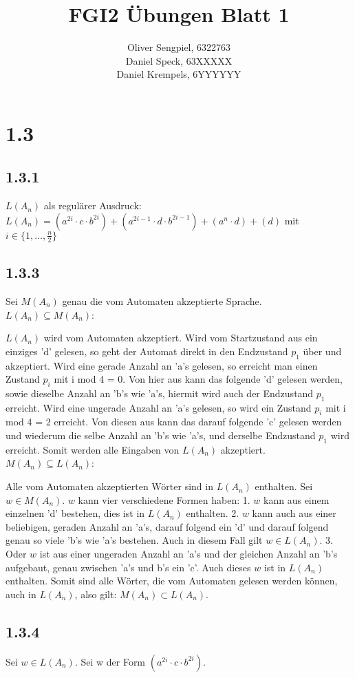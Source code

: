 \documentclass{article}
\title{FGI2 Übungen Blatt 1}
\author{Oliver Sengpiel, 6322763 \\
	Daniel Speck, 63XXXXX \\
	Daniel Krempels, 6YYYYYY}
\begin{document}
\maketitle

\section{1.3}
\subsection{1.3.1}
$L(A_n)$ als regulärer Ausdruck: \\
$L(A_n) = (a^{2i}\cdot c\cdot b^{2i}) + (a^{2i-1}\cdot d\cdot b^{2i-1}) +
(a^{n}\cdot d) + (d)$ mit $i \in \{1, \dots, \frac{n}{2} \}$

\subsection{1.3.3}
Sei $M(A_n)$ genau die vom Automaten akzeptierte Sprache. \\
$L(A_n) \subseteq M(A_n)$: 

$L(A_n)$ wird vom Automaten akzeptiert. Wird vom Startzustand aus ein einziges 'd' gelesen, so geht der Automat direkt in den Endzustand $p_1$ über und akzeptiert. Wird eine gerade Anzahl an 'a's gelesen, so erreicht man einen Zustand $p_i$ mit i mod 4 = 0. Von hier aus kann das folgende 'd' gelesen werden, sowie dieselbe Anzahl an 'b's wie 'a's, hiermit wird auch der Endzustand $p_1$ erreicht. Wird eine ungerade Anzahl an 'a's gelesen, so wird ein Zustand $p_i$ mit i mod 4 = 2 erreicht. Von diesen aus kann das darauf folgende 'c' gelesen werden und wiederum die selbe Anzahl an 'b's wie 'a's, und derselbe Endzustand $p_1$ wird erreicht. Somit werden alle Eingaben von $L(A_n)$ akzeptiert. \\
$M(A_n) \subseteq L(A_n)$: 

Alle vom Automaten akzeptierten Wörter sind in $L(A_n)$ enthalten. Sei $w \in M(A_n)$. $w$ kann vier verschiedene Formen haben: 1. $w$ kann aus einem einzelnen 'd' bestehen, dies ist in $L(A_n)$ enthalten. 2. $w$ kann auch aus einer beliebigen, geraden Anzahl an 'a's, darauf folgend ein 'd' und darauf folgend genau so viele 'b's wie 'a's bestehen. Auch in diesem Fall gilt $w \in L(A_n)$. 3. Oder $w$ ist aus einer ungeraden Anzahl an 'a's und der gleichen Anzahl an 'b's aufgebaut, genau zwischen 'a's und b's ein 'c'. Auch dieses $w$ ist in $L(A_n)$ enthalten. Somit sind alle Wörter, die vom Automaten gelesen werden können, auch in $L(A_n)$, also gilt: $M(A_n) \subset L(A_n)$. 

\subsection{1.3.4}

Sei $w \in L(A_n)$. Sei w der Form $(a^{2i}\cdot c\cdot b^{2i})$. 
\end{document}

